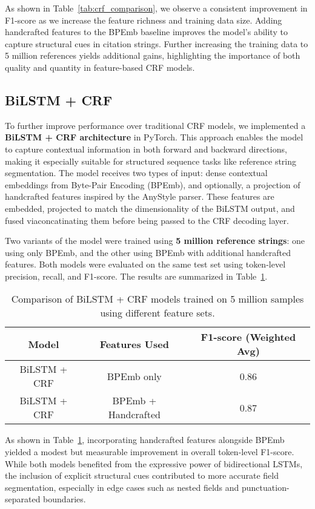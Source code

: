 As shown in Table~\ref{tab:crf_comparison}, we observe a consistent improvement in F1-score as we increase the feature richness and training data size. Adding handcrafted features to the BPEmb baseline improves the model's ability to capture structural cues in citation strings. Further increasing the training data to 5 million references yields additional gains, highlighting the importance of both quality and quantity in feature-based CRF models.


\subsection{BiLSTM + CRF}
To further improve performance over traditional CRF models, we implemented a \textbf{BiLSTM + CRF architecture} in PyTorch. This approach enables the model to capture contextual information in both forward and backward directions, making it especially suitable for structured sequence tasks like reference string segmentation. The model receives two types of input: dense contextual embeddings from Byte-Pair Encoding (BPEmb), and optionally, a projection of handcrafted features inspired by the AnyStyle parser. These features are embedded, projected to match the dimensionality of the BiLSTM output, and fused viaconcatinating them before being passed to the CRF decoding layer.

Two variants of the model were trained using \textbf{5 million reference strings}: one using only BPEmb, and the other using BPEmb with additional handcrafted features. Both models were evaluated on the same test set using token-level precision, recall, and F1-score. The results are summarized in Table~\ref{tab:bilstm_comparison}.
\begin{table}[h]
    \centering
    \begin{tabular}{|c|c|c|}
    \hline
    \textbf{Model} & \textbf{Features Used} & \textbf{F1-score (Weighted Avg)} \\
    \hline
    BiLSTM + CRF & BPEmb only & 0.86 \\
    BiLSTM + CRF & BPEmb + Handcrafted & 0.87 \\
    \hline
    \end{tabular}
    \caption{Comparison of BiLSTM + CRF models trained on 5 million samples using different feature sets.}
    \label{tab:bilstm_comparison}
\end{table}

As shown in Table~\ref{tab:bilstm_comparison}, incorporating handcrafted features alongside BPEmb yielded a modest but measurable improvement in overall token-level F1-score. While both models benefited from the expressive power of bidirectional LSTMs, the inclusion of explicit structural cues contributed to more accurate field segmentation, especially in edge cases such as nested fields and punctuation-separated boundaries.

